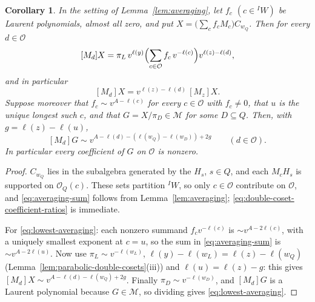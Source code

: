 \documentclass[11pt,a4paper,reqno]{amsart}
\numberwithin{equation}{section}
\newtheorem{corollary}[theorem]{Corollary}
\theoremstyle{definition}
\theoremstyle{remark}
\theoremstyle{plain}
\newcommand{\M}{\mathcal M}
\begin{document}
\begin{corollary}\label{cor:lowest}
In the setting of Lemma~\ref{lem:averaging}, let $f_c$ $(c\in{}^IW)$ be Laurent polynomials, almost all zero, and put
$X=\bigl(\sum_cf_cM_c\bigr)C_{w_Q}$. Then for every $d\in\mathcal O$
\begin{equation}\label{eq:averaging-sum}
 [M_d]X=\pi_L\,v^{\ell(y)}\Bigl(\sum_{c\in\mathcal O}f_c\,v^{-\ell(c)}\Bigr)v^{\ell(z)-\ell(d)},
\end{equation}
and in particular
\begin{equation}\label{eq:double-coset-coefficient-ratios}
 [M_d]X=v^{\ell(z)-\ell(d)}\,[M_z]X .
\end{equation}
Suppose moreover that $f_c\sim v^{A-\ell(c)}$ for every $c\in\mathcal O$ with $f_c\neq0$, that $u$ is the unique
longest such $c$, and that $G=X/\pi_D\in\M$ for some $D\subseteq Q$. Then, with $g=\ell(z)-\ell(u)$,
\begin{equation}\label{eq:lowest-averaging}
 [M_d]G\sim v^{A-\ell(d)-(\ell(w_Q)-\ell(w_D))+2g}\qquad(d\in\mathcal O).
\end{equation}
In particular every coefficient of $G$ on $\mathcal O$ is nonzero.
\end{corollary}
\begin{proof}
$C_{w_Q}$ lies in the subalgebra generated by the $H_s$, $s\in Q$, and each $M_cH_s$ is supported on $\mathcal O_Q(c)$.
These sets partition ${}^IW$, so only $c\in\mathcal O$ contribute on $\mathcal O$, and
\eqref{eq:averaging-sum} follows from Lemma~\ref{lem:averaging}; \eqref{eq:double-coset-coefficient-ratios} is immediate.

For \eqref{eq:lowest-averaging}: each nonzero summand $f_cv^{-\ell(c)}$ is $\sim v^{A-2\ell(c)}$, with a uniquely
smallest exponent at $c=u$, so the sum in \eqref{eq:averaging-sum} is $\sim v^{A-2\ell(u)}$. Now use $\pi_L\sim v^{-\ell(w_L)}$,
$\ell(y)-\ell(w_L)=\ell(z)-\ell(w_Q)$ (Lemma~\ref{lem:parabolic-double-cosets}(iii)) and $\ell(u)=\ell(z)-g$:
this gives $[M_d]X\sim v^{A-\ell(d)-\ell(w_Q)+2g}$. Finally $\pi_D\sim v^{-\ell(w_D)}$, and
$[M_d]G$ is a Laurent polynomial because $G\in\M$, so dividing gives \eqref{eq:lowest-averaging}.
\end{proof}
\end{document}
